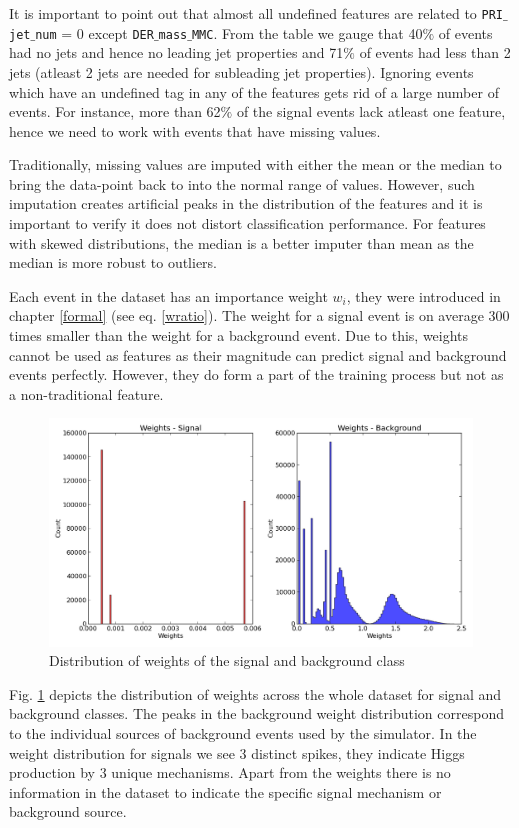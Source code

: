 It is important to point out that almost all undefined features are related to \texttt{PRI$\_$jet$\_$num} = 0 except \texttt{DER$\_$mass$\_$MMC}. From the table we gauge that 40$\%$ of events had no jets and hence no leading jet properties and 71$\%$ of events had less than 2 jets (atleast 2 jets are needed for subleading jet properties). Ignoring events which have an undefined tag in any of the features gets rid of a large number of events. For instance, more than 62$\%$ of the signal events lack atleast one feature, hence we need to work with events that have missing values.  

Traditionally, missing values are imputed with either the mean or the median to bring the data-point back to into the normal range of values. However, such imputation creates artificial peaks in the distribution of the features and it is important to verify it does not distort classification performance. For features with skewed distributions, the median is a better imputer than mean as the median is more robust to outliers. 

Each event in the dataset has an importance weight $w_{i}$, they were introduced in chapter \ref{formal} (see eq. \ref{wratio}). The weight for a signal event is on average 300 times smaller than the weight for a background event. Due to this, weights cannot be used as features as their magnitude can predict signal and background events perfectly. However, they do form a part of the training process but not as a non-traditional feature.

\begin{figure}[H]
\includegraphics[scale=0.5]{images/weights.png}
\caption{Distribution of weights of the signal and background class}
\label{weightsd}
\end{figure}

Fig. \ref{weightsd} depicts the distribution of weights across the whole dataset for signal and background classes. The peaks in the background weight distribution correspond to the individual sources of background events used by the simulator. In the weight distribution for signals we see 3 distinct spikes, they indicate Higgs production by 3 unique mechanisms. Apart from the weights there is no information in the dataset to indicate the specific signal mechanism or background source. 

